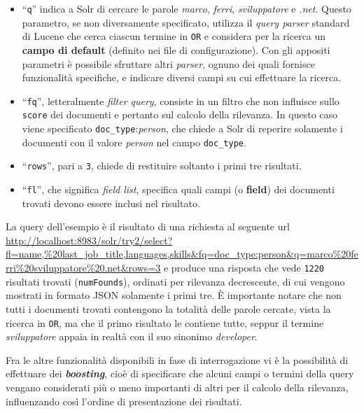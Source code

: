 \begin{itemize}
\item “\texttt{q}” indica a Solr di cercare le parole \textit{marco}, \textit{ferri}, \textit{sviluppatore} e \textit{.net}. Questo parametro, se non diversamente specificato, utilizza il \textit{query parser} standard di Lucene che cerca ciascun termine in \texttt{OR} e considera per la ricerca un \textbf{campo di default} (definito nei file di configurazione). Con gli appositi parametri è possibile sfruttare altri \textit{parser}, ognuno dei quali fornisce funzionalità specifiche, e indicare diversi campi su cui effettuare la ricerca.
\item “\texttt{fq}”, letteralmente \textit{filter query}, consiste in un filtro che non influisce sullo \texttt{score} dei documenti e pertanto sul calcolo della rilevanza. In questo caso viene specificato \texttt{doc\_type}:\textit{person}, che chiede a Solr di reperire solamente i documenti con il valore \textit{person} nel campo \texttt{doc\_type}.
\item “\texttt{rows}”, pari a \texttt{3}, chiede di restituire soltanto i primi tre risultati.
\item “\texttt{fl}”, che significa \textit{field list}, specifica quali campi (o \textbf{field}) dei documenti trovati devono essere inclusi nel risultato. 
\end{itemize}

\noindent
La query dell'esempio è il risultato di una richiesta al seguente url \newline
{\small\url{http://localhost:8983/solr/try2/select? fl=name,\%20last\_job\_title,languages,skills\&fq=doc\_type:person\&q=marco\%20ferri\%20sviluppatore\%20.net\&rows=3}} %
e produce una risposta che vede \texttt{1220} risultati trovati (\texttt{numFounds}), ordinati per rilevanza decrescente, di cui vengono mostrati in formato JSON solamente i primi tre. È importante notare che non tutti i documenti trovati contengono la totalità delle parole cercate, vista la ricerca in \texttt{OR}, ma che il primo risultato le contiene tutte, seppur il termine \textit{sviluppatore} appaia in realtà con il suo sinonimo \textit{developer}.

\vspace{2em}

Fra le altre funzionalità disponibili in fase di interrogazione vi è la possibilità di effettuare dei \textbf{\textit{boosting}}, cioè di specificare che alcuni campi o termini della query vengano considerati più o meno importanti di altri per il calcolo della rilevanza, influenzando così l’ordine di presentazione dei risultati.

